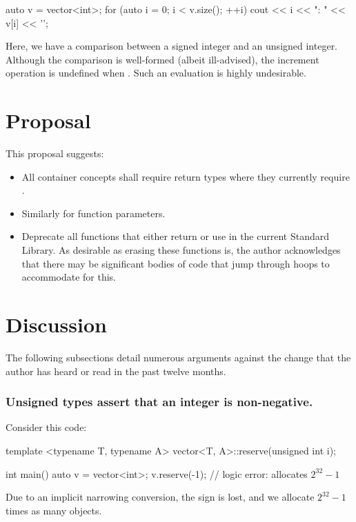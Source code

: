 \begin{codeblock}
auto v = vector<int>{};
for (auto i = 0; i < v.size(); ++i)
   cout << i << ": " << v[i] << '\n';
\end{codeblock}

Here, we have a comparison between a signed integer and an unsigned integer. Although the comparison
is well-formed (albeit ill-advised), the increment operation is undefined when
. Such an evaluation is highly undesirable.

\section*{Proposal}
This proposal suggests:

\begin{itemize}
   \item All container concepts shall require  return types where they
         currently require .
   \item Similarly for function parameters.
   \item Deprecate all functions that either return or use  in the current Standard
         Library. As desirable as erasing these functions is, the author acknowledges that there may
         be significant bodies of code that jump through hoops to accommodate for this.
\end{itemize}

\section*{Discussion}
The following subsections detail numerous arguments against the change that the author has heard or
read in the past twelve months.

\subsubsection*{Unsigned types assert that an integer is non-negative.}
Consider this code:

\begin{codeblock}
template <typename T, typename A>
vector<T, A>::reserve(unsigned int i);

int main()
{
   auto v = vector<int>{};
   v.reserve(-1); // logic error: allocates $2^{32} - 1$
}
\end{codeblock}

Due to an implicit narrowing conversion, the sign is lost, and we allocate $2^{32} - 1$ times as
many objects.

